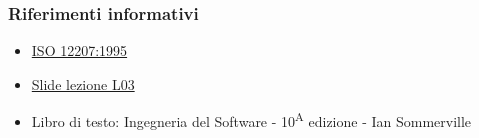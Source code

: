         \subsubsection{Riferimenti informativi}
        \begin{itemize}
            \item \href{https://www.math.unipd.it/~tullio/IS-1/2009/Approfondimenti/ISO_12207-1995.pdf}{ISO 12207:1995}
            \item \href{https://www.math.unipd.it/~tullio/IS-1/2020/Dispense/L03.pdf}{Slide lezione L03}
            \item Libro di testo: Ingegneria del Software - 10\textsuperscript{A} edizione - Ian Sommerville
        \end{itemize}